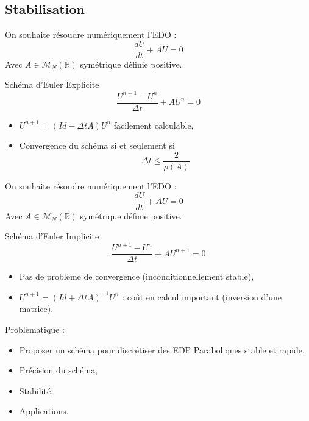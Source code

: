 \documentclass[11pt]{beamer}
\begin{document}
\subsection{Stabilisation}
\begin{frame}{}
On souhaite résoudre numériquement l'EDO :
\begin{equation}
\dfrac{dU}{dt} + AU=0
\end{equation}
Avec $A \in \mathcal{M}_N ( \mathbb{R} )$ symétrique définie positive.

\begin{block}{Schéma d'Euler Explicite}
\begin{equation}
\dfrac{U^{n+1}-U^n}{\Delta t} + A U^{n} = 0
\end{equation}
\begin{itemize}
\item $U^{n+1}=\left( Id - \Delta t A \right)U^n$ facilement calculable,
\item Convergence du schéma si et seulement si $$\Delta t \leq \dfrac{2}{\rho(A)}$$
\end{itemize}
\end{block}

\end{frame}

\begin{frame}{}
On souhaite résoudre numériquement l'EDO :
\begin{equation}
\dfrac{dU}{dt} + AU=0
\end{equation}
Avec $A \in \mathcal{M}_N ( \mathbb{R} )$ symétrique définie positive.

\begin{block}{Schéma d'Euler Implicite}
\begin{equation}
\dfrac{U^{n+1}-U^n}{\Delta t} + A U^{n+1} = 0
\end{equation}
\begin{itemize}
\item Pas de problème de convergence (inconditionnellement stable),
\item $U^{n+1}=\left( Id + \Delta t A \right)^{-1}U^{n}$ : coût en calcul important (inversion d'une matrice).
\end{itemize}
\end{block}

\end{frame}

\begin{frame}{Problèmatique :}
\begin{itemize}
\item Proposer un schéma pour discrétiser des EDP Paraboliques stable et rapide,
\item Précision du schéma,
\item Stabilité,
\item Applications.
\end{itemize}

\end{frame}
\end{document}
